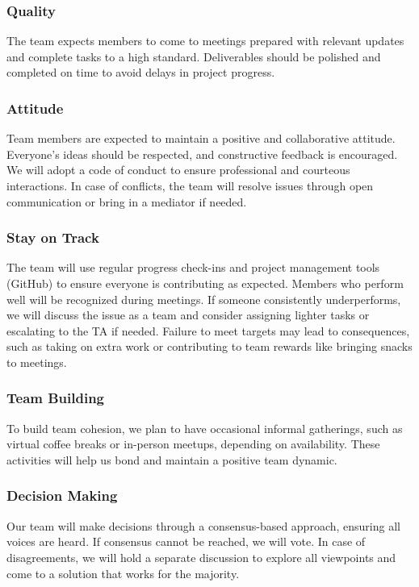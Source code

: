 \documentclass{article}
\begin{document}
\subsubsection*{Quality} 

The team expects members to come to meetings prepared with relevant updates and complete tasks
to a high standard. Deliverables should be polished and completed on time to avoid delays in
project progress.

\subsubsection*{Attitude}

Team members are expected to maintain a positive and collaborative attitude. Everyone’s ideas
should be respected, and constructive feedback is encouraged. We will adopt a code of conduct
to ensure professional and courteous interactions. In case of conflicts, the team will resolve
issues through open communication or bring in a mediator if needed.

\subsubsection*{Stay on Track}

The team will use regular progress check-ins and project management tools (GitHub)
to ensure everyone is contributing as expected. Members who perform well will be recognized during
meetings. If someone consistently underperforms, we will discuss the issue as a team and consider
assigning lighter tasks or escalating to the TA if needed. Failure to meet targets may lead to
consequences, such as taking on extra work or contributing to team rewards like bringing snacks to meetings.

\subsubsection*{Team Building}

To build team cohesion, we plan to have occasional informal gatherings, such as virtual coffee breaks
or in-person meetups, depending on availability. These activities will help us bond and maintain a 
positive team dynamic.

\subsubsection*{Decision Making} 

Our team will make decisions through a consensus-based approach, ensuring all voices are heard. If
consensus cannot be reached, we will vote. In case of disagreements, we will hold a separate discussion
to explore all viewpoints and come to a solution that works for the majority.
\end{document}
